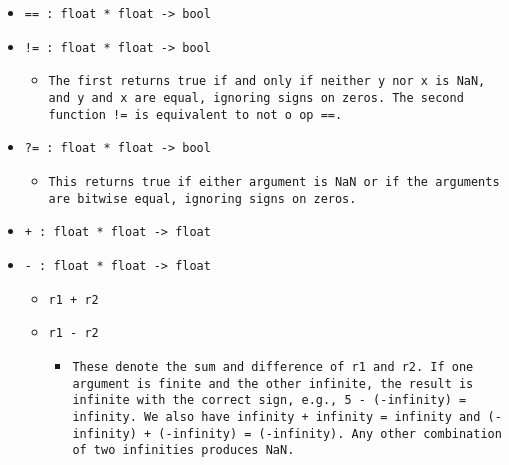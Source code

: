 \documentclass[11pt]{report}
\begin{document}
\begin{itemize}
\begin{itemize}
\begin{itemize}
\end{itemize}

\item  \texttt{== : float * float -> bool}

\item  \texttt{!= : float * float -> bool}

\begin{itemize}
\item \begin{flushleft} \texttt{The first returns true if and only if neither y nor x is NaN, and y and x are equal, ignoring signs on zeros. The second function != is equivalent to not o op ==.} \end{flushleft}
\coqdocemptyline


\end{itemize}

\item  \texttt{?= : float * float -> bool}

\begin{itemize}
\item \begin{flushleft} \texttt{This returns true if either argument is NaN or if the arguments are bitwise equal, ignoring signs on zeros.} \end{flushleft}
\newpage


\end{itemize}

\item  \texttt{+ : float * float -> float}

\item  \texttt{- : float * float -> float}

\begin{itemize}
\item \texttt{r1 + r2} 
\item \texttt{r1 - r2}

\begin{itemize}
\item \begin{flushleft} \texttt{These denote the sum and difference of r1 and r2. If one argument is finite and the other infinite, the result is infinite with the correct sign, e.g., 5 - (-infinity) = infinity. We also have infinity + infinity = infinity and (-infinity) + (-infinity) = (-infinity). Any other combination of two infinities produces NaN.} \end{flushleft}
\end{itemize}


\end{itemize}
\end{itemize}
\end{itemize}
\end{document}
